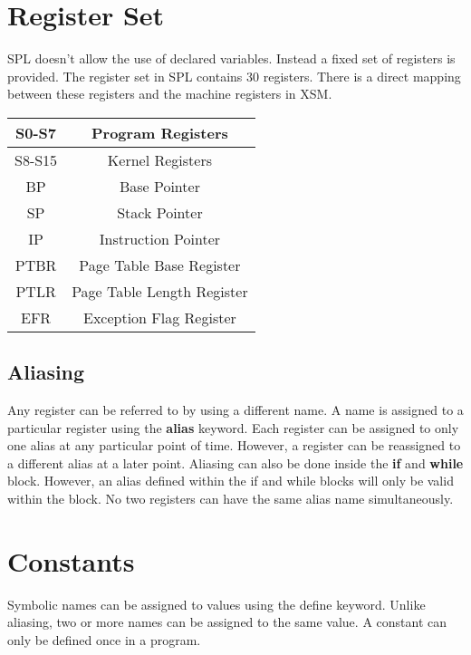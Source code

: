 \documentclass[11pt]{article}
\begin{document}
\section{Register Set}

SPL doesn’t allow the use of declared variables. Instead a fixed set of registers is provided. The register set in SPL contains 30 registers. There is a direct mapping between these registers and the machine registers in XSM.  \\

\begin{center}
\begin{tabular}{| c | c | }
\hline
S0-S7 & Program Registers \\
\hline
S8-S15 & Kernel Registers \\
\hline
BP 		& Base Pointer \\
\hline
SP		& Stack Pointer \\
\hline
IP		& Instruction Pointer \\
\hline
PTBR 	& Page Table Base Register \\
\hline
PTLR & Page Table Length Register \\
\hline
EFR & Exception Flag Register \\
\hline
\end{tabular}
\end{center}

\subsection{Aliasing}
Any register can be referred to by using a different name. A name is assigned to a particular register using the \textbf{alias} keyword. Each register can be assigned to only one alias at any particular point of time. However, a register can be reassigned to a different alias at a later point. Aliasing can also be done inside the \textbf{if} and \textbf{while} block. However, an alias defined within the if and while blocks will only be valid within the block. No two registers can have the same alias name simultaneously.



\section{Constants}
Symbolic names can be assigned to values using the define keyword. Unlike aliasing, two or more names can be assigned to the same value. A constant can only be defined once in a program.
\end{document}
